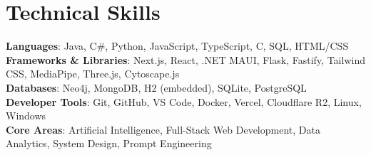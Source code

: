 \documentclass[a4paper,10pt]{article}
\begin{document}
\section{Technical Skills}
 \begin{itemize}[leftmargin=0.15in, label={}]
    \small{\item{
     \textbf{Languages}{: Java, C\#, Python, JavaScript, TypeScript, C, SQL, HTML/CSS} \\
     \textbf{Frameworks \& Libraries}{: Next.js, React, .NET MAUI, Flask, Fastify, Tailwind CSS, MediaPipe, Three.js, Cytoscape.js} \\
     \textbf{Databases}{: Neo4j, MongoDB, H2 (embedded), SQLite, PostgreSQL} \\
     \textbf{Developer Tools}{: Git, GitHub, VS Code, Docker, Vercel, Cloudflare R2, Linux, Windows} \\
     \textbf{Core Areas}{: Artificial Intelligence, Full-Stack Web Development, Data Analytics, System Design, Prompt Engineering}
    }}
 \end{itemize}


\end{document}
